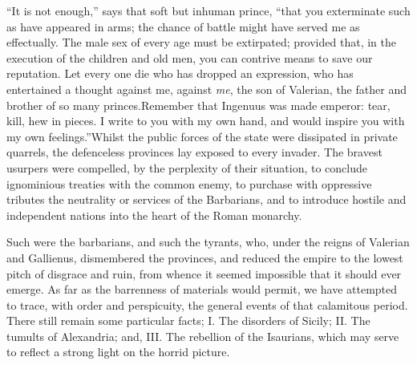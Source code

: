 “It is not enough,” says that soft but inhuman prince, “that you
exterminate such as have appeared in arms; the chance of battle
might have served me as effectually. The male sex of every age
must be extirpated; provided that, in the execution of the
children and old men, you can contrive means to save our
reputation. Let every one die who has dropped an expression, who
has entertained a thought against me, against \textit{me}, the son of
Valerian, the father and brother of so many princes.\footnotemark[166] Remember
that Ingenuus was made emperor: tear, kill, hew in pieces. I
write to you with my own hand, and would inspire you with my own
feelings.”\footnotemark[167] Whilst the public forces of the state were
dissipated in private quarrels, the defenceless provinces lay
exposed to every invader. The bravest usurpers were compelled, by
the perplexity of their situation, to conclude ignominious
treaties with the common enemy, to purchase with oppressive
tributes the neutrality or services of the Barbarians, and to
introduce hostile and independent nations into the heart of the
Roman monarchy.\footnotemark[168]




Such were the barbarians, and such the tyrants, who, under the
reigns of Valerian and Gallienus, dismembered the provinces, and
reduced the empire to the lowest pitch of disgrace and ruin, from
whence it seemed impossible that it should ever emerge. As far as
the barrenness of materials would permit, we have attempted to
trace, with order and perspicuity, the general events of that
calamitous period. There still remain some particular facts; I.
The disorders of Sicily; II. The tumults of Alexandria; and, III.
The rebellion of the Isaurians, which may serve to reflect a
strong light on the horrid picture.

